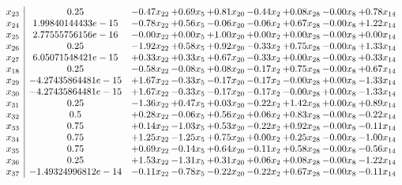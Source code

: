 \documentclass[8pt]{article}
\begin{document}
\[\begin{array}{c| c c@{\hskip 2pt} c@{\hskip 2pt} c@{\hskip 2pt} c@{\hskip 2pt} c@{\hskip 2pt} c@{\hskip 2pt} c@{\hskip 2pt} }
 x_{23}   &  0.25 & -0.47 x_{22} & +  0.69 x_{5} & +  0.81 x_{20} & -0.44 x_{2} & +  0.08 x_{28} & -0.00 x_{8} & +  0.78 x_{14}\\
 x_{24}   &  1.99840144433e-15 & -0.78 x_{22} & +  0.56 x_{5} & -0.06 x_{20} & -0.06 x_{2} & +  0.67 x_{28} & -0.00 x_{8} & +  1.22 x_{14}\\
 x_{25}   &  2.77555756156e-16 & -0.00 x_{22} & +  0.00 x_{5} & +  1.00 x_{20} & +  0.00 x_{2} & +  0.00 x_{28} & -0.00 x_{8} & +  0.00 x_{14}\\
 x_{26}   &  0.25 & -1.92 x_{22} & +  0.58 x_{5} & +  0.92 x_{20} & -0.33 x_{2} & +  0.75 x_{28} & -0.00 x_{8} & +  1.33 x_{14}\\
 x_{27}   &  6.05071548421e-15 & +  0.33 x_{22} & +  0.33 x_{5} & +  0.67 x_{20} & -0.33 x_{2} & +  0.00 x_{28} & -0.00 x_{8} & +  0.33 x_{14}\\
 x_{18}   &  0.25 & -0.58 x_{22} & -0.08 x_{5} & +  0.08 x_{20} & -0.17 x_{2} & +  0.75 x_{28} & -0.00 x_{8} & +  0.67 x_{14}\\
 x_{29}   &  -4.27435864481e-15 & +  1.67 x_{22} & -0.33 x_{5} & -0.17 x_{20} & -0.17 x_{2} & -0.00 x_{28} & +  0.00 x_{8} & -1.33 x_{14}\\
 x_{30}   &  -4.27435864481e-15 & +  1.67 x_{22} & -0.33 x_{5} & -0.17 x_{20} & -0.17 x_{2} & -0.00 x_{28} & +  0.00 x_{8} & -1.33 x_{14}\\
 x_{31}   &  0.25 & -1.36 x_{22} & +  0.47 x_{5} & +  0.03 x_{20} & -0.22 x_{2} & +  1.42 x_{28} & +  0.00 x_{8} & +  0.89 x_{14}\\
 x_{32}   &  0.5 & +  0.28 x_{22} & -0.06 x_{5} & +  0.56 x_{20} & +  0.06 x_{2} & +  0.83 x_{28} & -0.00 x_{8} & -0.22 x_{14}\\
 x_{33}   &  0.75 & +  0.14 x_{22} & -1.03 x_{5} & +  0.53 x_{20} & -0.22 x_{2} & +  0.92 x_{28} & -0.00 x_{8} & -0.11 x_{14}\\
 x_{34}   &  0.75 & +  1.25 x_{22} & -1.25 x_{5} & +  0.75 x_{20} & +  0.00 x_{2} & +  0.25 x_{28} & -0.00 x_{8} & -1.00 x_{14}\\
 x_{35}   &  0.75 & +  0.69 x_{22} & -0.14 x_{5} & +  0.64 x_{20} & -0.11 x_{2} & +  0.58 x_{28} & -0.00 x_{8} & -0.56 x_{14}\\
 x_{36}   &  0.25 & +  1.53 x_{22} & -1.31 x_{5} & +  0.31 x_{20} & +  0.06 x_{2} & +  0.08 x_{28} & -0.00 x_{8} & -1.22 x_{14}\\
 x_{37}   &  -1.49324996812e-14 & -0.11 x_{22} & -0.78 x_{5} & -0.22 x_{20} & -0.22 x_{2} & +  0.67 x_{28} & -0.00 x_{8} & -0.11 x_{14}\\

\end{array}\]
\end{document}
